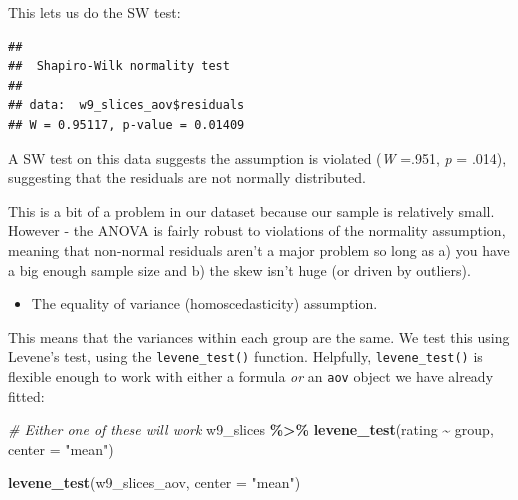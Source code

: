 \documentclass[
]{book}
\newenvironment{Shaded}{\begin{snugshade}}{\end{snugshade}}
\newcommand{\AttributeTok}[1]{\textcolor[rgb]{0.13,0.29,0.53}{#1}}
\newcommand{\CommentTok}[1]{\textcolor[rgb]{0.56,0.35,0.01}{\textit{#1}}}
\newcommand{\FunctionTok}[1]{\textcolor[rgb]{0.13,0.29,0.53}{\textbf{#1}}}
\newcommand{\NormalTok}[1]{#1}
\newcommand{\SpecialCharTok}[1]{\textcolor[rgb]{0.81,0.36,0.00}{\textbf{#1}}}
\newcommand{\StringTok}[1]{\textcolor[rgb]{0.31,0.60,0.02}{#1}}
\providecommand{\tightlist}{%
  \setlength{\itemsep}{0pt}\setlength{\parskip}{0pt}}
\begin{document}
\begin{Shaded}
\end{Shaded}

This lets us do the SW test:

\begin{Shaded}
\end{Shaded}

\begin{verbatim}
## 
##  Shapiro-Wilk normality test
## 
## data:  w9_slices_aov$residuals
## W = 0.95117, p-value = 0.01409
\end{verbatim}

A SW test on this data suggests the assumption is violated (\emph{W} =.951, \emph{p} =
.014), suggesting that the residuals are not normally distributed.

This is a bit of a problem in our dataset because our sample is relatively small. However - the ANOVA is fairly robust to violations of the normality assumption, meaning that non-normal residuals aren't a major problem so long as a) you have a big enough sample size and b) the skew isn't huge (or driven by outliers).

\begin{itemize}
\tightlist
\item
  The equality of variance (homoscedasticity) assumption.
\end{itemize}

This means that the variances within each group are the same. We test this using Levene's test, using the \texttt{levene\_test()} function. Helpfully, \texttt{levene\_test()} is flexible enough to work with either a formula \emph{or} an \texttt{aov} object we have already fitted:

\begin{Shaded}
\begin{Highlighting}[]
\CommentTok{\# Either one of these will work}
\NormalTok{w9\_slices }\SpecialCharTok{\%\textgreater{}\%}
  \FunctionTok{levene\_test}\NormalTok{(rating }\SpecialCharTok{\textasciitilde{}}\NormalTok{ group, }\AttributeTok{center =} \StringTok{"mean"}\NormalTok{)}

\FunctionTok{levene\_test}\NormalTok{(w9\_slices\_aov, }\AttributeTok{center =} \StringTok{"mean"}\NormalTok{)}
\end{Highlighting}
\end{Shaded}
\end{document}
